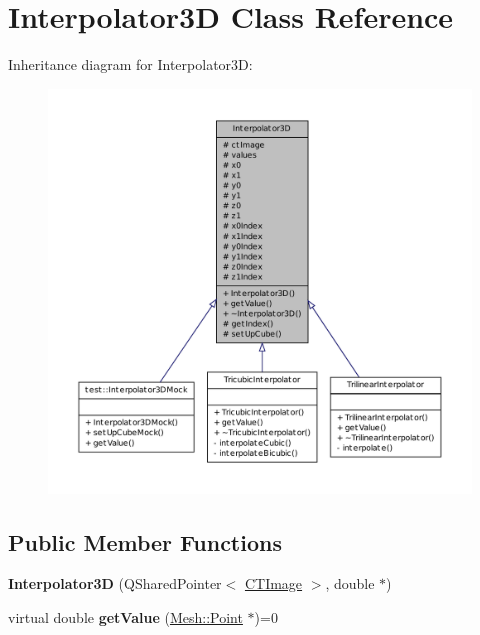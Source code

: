 \hypertarget{class_interpolator3_d}{
\section{Interpolator3D Class Reference}
\label{class_interpolator3_d}
}


Inheritance diagram for Interpolator3D:
\nopagebreak
\begin{figure}[H]
\begin{center}
\leavevmode
\includegraphics[width=400pt]{class_interpolator3_d__inherit__graph}
\end{center}
\end{figure}
\subsection*{Public Member Functions}
\begin{DoxyCompactItemize}
\item 
\hypertarget{class_interpolator3_d_ad96493b8529c1f672c22f8d290420348}{
{\bfseries Interpolator3D} (QSharedPointer$<$ \hyperlink{class_c_t_image}{CTImage} $>$, double $\ast$)}
\label{class_interpolator3_d_ad96493b8529c1f672c22f8d290420348}

\item 
\hypertarget{class_interpolator3_d_a42a5808d1269cfb7fe38b0bfc85c18c3}{
virtual double {\bfseries getValue} (\hyperlink{struct_mesh_1_1_point}{Mesh::Point} $\ast$)=0}
\label{class_interpolator3_d_a42a5808d1269cfb7fe38b0bfc85c18c3}

\end{DoxyCompactItemize}
